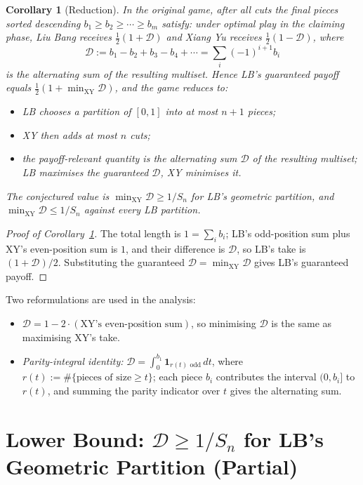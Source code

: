 \documentclass[11pt]{article}
\newtheorem{corollary}[theorem]{Corollary}
\theoremstyle{definition}
\newcommand{\D}{\mathcal{D}}
\newcommand{\XY}{\mathrm{XY}}
\begin{document}
\begin{corollary}[Reduction]\label{cor:reduction}
In the original game, after all cuts the final pieces sorted descending
$b_1\ge b_2\ge\cdots\ge b_m$ satisfy: under optimal play in the claiming phase,
Liu Bang receives $\tfrac{1}{2}(1+\D)$ and Xiang Yu receives
$\tfrac{1}{2}(1-\D)$, where
\[
\D:=b_1-b_2+b_3-b_4+\cdots=\sum_{i}(-1)^{i+1}b_i
\]
is the alternating sum of the resulting multiset. Hence LB's guaranteed payoff
equals $\tfrac{1}{2}(1+\min_{\XY}\D)$, and the game reduces to:
\begin{itemize}[leftmargin=2em]
\item LB chooses a partition of $[0,1]$ into at most $n+1$ pieces;
\item XY then adds at most $n$ cuts;
\item the payoff-relevant quantity is the alternating sum $\D$ of the resulting
multiset; LB maximises the guaranteed $\D$, XY minimises it.
\end{itemize}
The conjectured value is $\min_{\XY}\D\ge 1/S_n$ for LB's geometric partition,
and $\min_{\XY}\D\le 1/S_n$ against every LB partition.
\end{corollary}

\begin{proof}[Proof of Corollary~\ref{cor:reduction}]
The total length is $1=\sum_i b_i$; LB's odd-position sum plus XY's
even-position sum is $1$, and their difference is $\D$, so LB's take is
$(1+\D)/2$. Substituting the guaranteed $\D=\min_{\XY}\D$ gives LB's guaranteed
payoff.
\end{proof}

Two reformulations are used in the analysis:
\begin{itemize}[leftmargin=2em]
\item[(i)] $\D=1-2\cdot(\text{XY's even-position sum})$, so minimising $\D$
is the same as maximising XY's take.
\item[(ii)] \emph{Parity-integral identity:} $\D=\int_0^{b_1}\mathbf{1}_{r(t)\text{ odd}}\,dt$,
where $r(t):=\#\{\text{pieces of size}\ge t\}$; each piece $b_i$ contributes
the interval $(0,b_i]$ to $r(t)$, and summing the parity indicator over $t$
gives the alternating sum.
\end{itemize}

\section{Lower Bound: $\D\ge 1/S_n$ for LB's Geometric Partition (Partial)}
\end{document}
